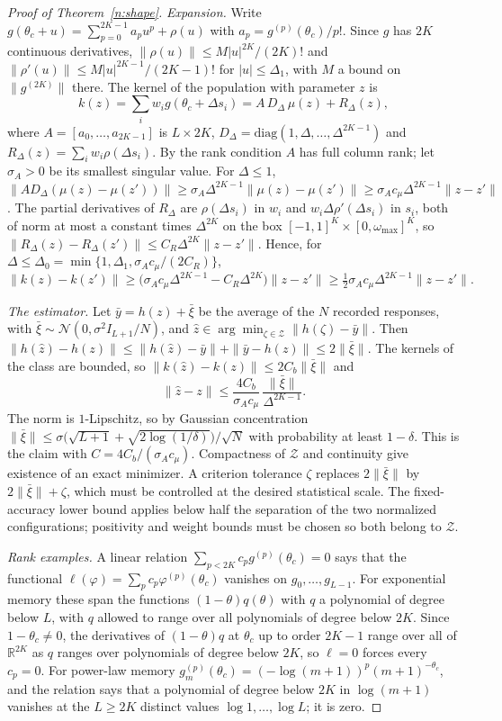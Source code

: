 \documentclass[12pt]{article}
\theoremstyle{definition}
\theoremstyle{remark}
\begin{document}
\begin{proof}[Proof of Theorem~\ref{n:shape}]
\emph{Expansion.} Write $g(\theta_c+u)=\sum_{p=0}^{2K-1}a_pu^p+\rho(u)$ with $a_p=g^{(p)}(\theta_c)/p!$. Since $g$ has $2K$ continuous derivatives, $\|\rho(u)\|\le M|u|^{2K}/(2K)!$ and $\|\rho'(u)\|\le M|u|^{2K-1}/(2K-1)!$ for $|u|\le\Delta_1$, with $M$ a bound on $\|g^{(2K)}\|$ there. The kernel of the population with parameter $z$ is
\[
k(z)=\sum_iw_ig(\theta_c+\Delta s_i)=A\,D_\Delta\,\mu(z)+R_\Delta(z),
\]
where $A=[a_0,\ldots,a_{2K-1}]$ is $L\times2K$, $D_\Delta=\mathrm{diag}(1,\Delta,\ldots,\Delta^{2K-1})$ and $R_\Delta(z)=\sum_iw_i\rho(\Delta s_i)$. By the rank condition $A$ has full column rank; let $\sigma_A>0$ be its smallest singular value. For $\Delta\le1$, $\|AD_\Delta(\mu(z)-\mu(z'))\|\ge\sigma_A\Delta^{2K-1}\|\mu(z)-\mu(z')\|\ge\sigma_Ac_\mu\Delta^{2K-1}\|z-z'\|$. The partial derivatives of $R_\Delta$ are $\rho(\Delta s_i)$ in $w_i$ and $w_i\Delta\rho'(\Delta s_i)$ in $s_i$, both of norm at most a constant times $\Delta^{2K}$ on the box $[-1,1]^K\times[0,\omega_{\max}]^K$, so $\|R_\Delta(z)-R_\Delta(z')\|\le C_R\Delta^{2K}\|z-z'\|$. Hence, for $\Delta\le\Delta_0=\min\{1,\Delta_1,\sigma_Ac_\mu/(2C_R)\}$,
\[
\|k(z)-k(z')\|\ge\big(\sigma_Ac_\mu\Delta^{2K-1}-C_R\Delta^{2K}\big)\|z-z'\|\ge\tfrac12\sigma_Ac_\mu\Delta^{2K-1}\|z-z'\|.
\]

\emph{The estimator.} Let $\bar y=h(z)+\bar\xi$ be the average of the $N$ recorded responses, with $\bar\xi\sim\mathcal N(0,\sigma^2I_{L+1}/N)$, and $\hat z\in\arg\min_{\zeta\in\mathcal Z}\|h(\zeta)-\bar y\|$. Then $\|h(\hat z)-h(z)\|\le\|h(\hat z)-\bar y\|+\|\bar y-h(z)\|\le2\|\bar\xi\|$. The kernels of the class are bounded, so $\|k(\hat z)-k(z)\|\le2C_b\|\bar\xi\|$ and
\[
\|\hat z-z\|\le\frac{4C_b}{\sigma_Ac_\mu}\,\frac{\|\bar\xi\|}{\Delta^{2K-1}}.
\]
The norm is $1$-Lipschitz, so by Gaussian concentration $\|\bar\xi\|\le\sigma\big(\sqrt{L+1}+\sqrt{2\log(1/\delta)}\big)/\sqrt N$ with probability at least $1-\delta$. This is the claim with $C=4C_b/(\sigma_Ac_\mu)$. Compactness of $\mathcal Z$ and continuity give existence of an exact minimizer. A criterion tolerance $\zeta$ replaces $2\|\bar\xi\|$ by $2\|\bar\xi\|+\zeta$, which must be controlled at the desired statistical scale. The fixed-accuracy lower bound applies below half the separation of the two normalized configurations; positivity and weight bounds must be chosen so both belong to $\mathcal Z$.

\emph{Rank examples.} A linear relation $\sum_{p<2K}c_pg^{(p)}(\theta_c)=0$ says that the functional $\ell(\varphi)=\sum_pc_p\varphi^{(p)}(\theta_c)$ vanishes on $g_0,\ldots,g_{L-1}$. For exponential memory these span the functions $(1-\theta)q(\theta)$ with $q$ a polynomial of degree below $L$, with $q$ allowed to range over all polynomials of degree below $2K$. Since $1-\theta_c\ne0$, the derivatives of $(1-\theta)q$ at $\theta_c$ up to order $2K-1$ range over all of $\mathbb R^{2K}$ as $q$ ranges over polynomials of degree below $2K$, so $\ell=0$ forces every $c_p=0$. For power-law memory $g_m^{(p)}(\theta_c)=(-\log(m+1))^p(m+1)^{-\theta_c}$, and the relation says that a polynomial of degree below $2K$ in $\log(m+1)$ vanishes at the $L\ge2K$ distinct values $\log1,\ldots,\log L$; it is zero.
\end{proof}
\end{document}
